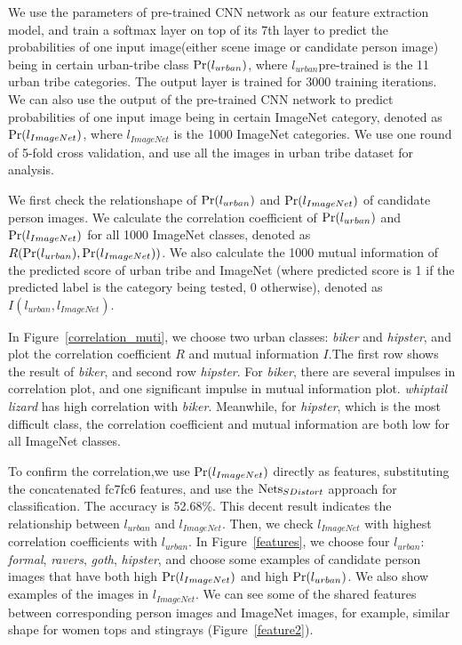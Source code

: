 \documentclass[10pt,twocolumn,letterpaper]{article}
\begin{document}
We use the parameters of pre-trained CNN network as our feature extraction model, and train a softmax layer  
on top of its 7th layer to predict the probabilities of one input image(either scene image or candidate person image) being in certain urban-tribe class $\textup{Pr}(l_{urban})$, where $l_{urban} $pre-trained is the 11 urban tribe categories. The output layer is trained for 3000 training iterations. We can also use the output of the pre-trained CNN network to predict probabilities of one input image being in certain ImageNet category, denoted as $\textup{Pr}(l_{ImageNet})$, where $l_{ImageNet}$ is the 1000 ImageNet categories. We use one round of 5-fold cross validation, and use all the images in urban tribe dataset for analysis.

We first check the relationshape of $\textup{Pr}(l_{urban})$ and $\textup{Pr}(l_{ImageNet})$ of candidate person images. We calculate the correlation coefficient of $\textup{Pr}(l_{urban})$ and $\textup{Pr}(l_{ImageNet})$ for all 1000 ImageNet classes, denoted as $R(\textup{Pr}(l_{urban}), \textup{Pr}(l_{ImageNet}))$. We also calculate the 1000 mutual information of the predicted score of urban tribe and ImageNet (where predicted score is 1 if the predicted label is the category being tested, 0 otherwise), denoted as $I(l_{urban}, l_{ImageNet})$. 

In Figure~\ref{correlation_muti}, we choose two urban classes: \emph{biker} and \emph{hipster}, and plot the correlation coefficient $R$ and mutual information $I$.The first row shows the result of \emph{biker}, and second row \emph{hipster}. For \emph{biker}, there are several impulses in correlation plot, and one significant impulse in mutual information plot. \emph{whiptail lizard} has high correlation with \emph{biker}. Meanwhile, for \emph{hipster}, which is the most difficult class, the correlation coefficient and mutual information are both low for all ImageNet classes.

To confirm the correlation,we use $\textup{Pr}(l_{ImageNet})$ directly as features, substituting the concatenated fc7fc6 features, and use the $\textup{Nets}_{SDistort}$ approach for classification. The accuracy is 52.68\%. This decent result indicates the relationship between $l_{urban}$ and $l_{ImageNet}$.
Then, we check $l_{ImageNet}$ with highest correlation coefficients with $l_{urban}$. In Figure~\ref{features}, we choose four $l_{urban}$: \emph{formal}, \emph{ravers}, \emph{goth}, \emph{hipster}, and choose some examples of candidate person images that have both high $\textup{Pr}(l_{ImageNet})$ and high  $\textup{Pr}(l_{urban})$. We also show examples of the images in $l_{ImageNet}$. We can see some of the shared features between corresponding person images and ImageNet images, for example, similar shape for women tops and stingrays (Figure~\ref{feature2}). 
\end{document}
